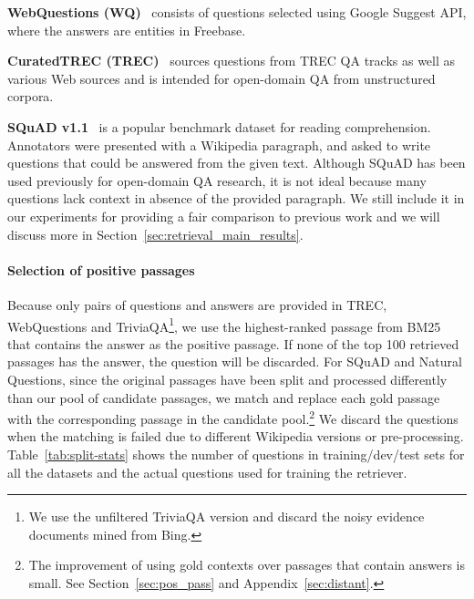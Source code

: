 \noindent
\textbf{WebQuestions (WQ)}~\cite{berant2013semantic} consists of questions selected using Google Suggest API, where the answers are entities in Freebase.

\noindent
\textbf{CuratedTREC (TREC)}~\cite{baudivs2015modeling} sources questions from TREC QA tracks as well as various Web sources
and is intended for open-domain QA from unstructured corpora.

\noindent
\textbf{SQuAD v1.1}~\cite{rajpurkar2016squad} is a popular benchmark dataset for reading comprehension.
Annotators were presented with a Wikipedia paragraph, and asked to write questions that could be answered from the given text.
Although SQuAD has been used previously for open-domain QA research, it is not ideal because many questions lack context in absence of the provided paragraph.
We still include it in our experiments for providing a fair comparison to previous work and we will discuss more in Section~\ref{sec:retrieval_main_results}.


\paragraph{Selection of positive passages} %

Because only pairs of questions and answers are provided in TREC, WebQuestions and TriviaQA\footnote{We use the unfiltered TriviaQA version and discard the noisy evidence documents mined from Bing.}, we use the highest-ranked passage from BM25 that contains the answer as the positive passage.  If none of the top 100 retrieved passages has the answer, the question will be discarded.
For SQuAD and Natural Questions, since the original passages have been split and processed differently than our pool of candidate passages, we match and replace each gold passage with the corresponding passage in the candidate pool.\footnote{The improvement of using gold contexts over passages that contain answers is small. See Section~\ref{sec:pos_pass} and Appendix~\ref{sec:distant}.}
We discard the questions when the matching is failed due to different Wikipedia versions or pre-processing.
Table~\ref{tab:split-stats} shows the number of questions in training/dev/test sets for all the datasets and the actual questions used for training the retriever.




